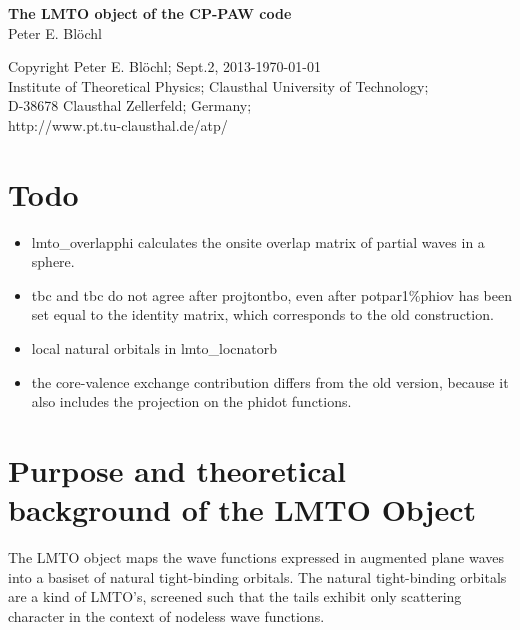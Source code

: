 \documentclass[11pt,a4paper]{report}
\begin{document}
\begin{titlepage}
\begin{center}
\vspace*{3.5cm}
{\huge \textbf{The LMTO object of the CP-PAW code}}\\
\vspace{0.5cm}
{\large Peter E. Bl\"ochl}
\vspace{0.5cm} 
\end{center}

\vfill
\begin{center}
Copyright Peter E. Bl\"ochl; Sept.2, 2013-\today\\
{\small
Institute of Theoretical Physics;
Clausthal University of Technology;\\ 
D-38678 Clausthal Zellerfeld; Germany;\\
http://www.pt.tu-clausthal.de/atp/}
\end{center}
\end{titlepage}
\noindent            
\tableofcontents
\chapter{Todo}
\begin{itemize}
\item lmto\_overlapphi calculates the onsite overlap matrix of partial
  waves in a sphere.
%
\item tbc and tbc do not agree after projtontbo, even after
  potpar1\%phiov has been set equal to the identity matrix, which
  corresponds to the old construction.
%
\item local natural orbitals in lmto\_locnatorb
%
\item the core-valence exchange contribution differs from the old version,
  because it also includes the projection on the phidot functions.
\end{itemize}

\chapter{Purpose and theoretical background of the LMTO Object}
The LMTO object maps the wave functions expressed in augmented plane
waves into a basiset of natural tight-binding orbitals. The natural
tight-binding orbitals are a kind of LMTO's, screened such that the
tails exhibit only scattering character in the context of nodeless
wave functions\cite{bloechl12_arxiv1210_5937}.
\end{document}

